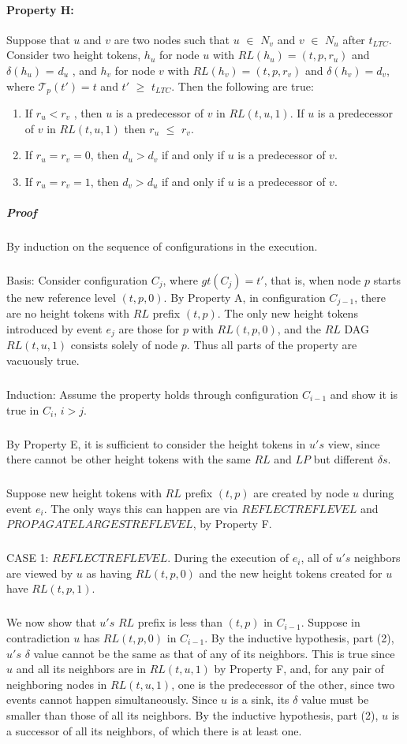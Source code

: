 \paragraph{Property H:} Suppose that $u$ and $v$ are two nodes such that $u$ $\in$ $N_v$ and $v$ $\in$ $N_u$ after $t_{LTC}$. Consider two height tokens, $h_u$ for node $u$ with $RL(h_u ) = (t, p, r_u )$ and $\delta (h_u )$ = $d_u$ , and $h_v$ for node $v$ with $RL(h_v ) = (t, p, r_v )$ and $\delta (h_v ) = d_v$, where $\mathcal{T}_p(t') = t$ and $t '$ $\geq$ $t_{LTC}$. Then the following are true: 
\begin{enumerate}
	\item If $r_u < r_v$ , then $u$ is a predecessor of $v$ in $RL (t, u, 1)$. If $u$ is a predecessor of $v$ in $RL (t, u, 1)$ then $r_u$ $\leq$ $r_v$.
	\item If $r_u = r_v = 0$, then $d_u > d_v$ if and only if $u$ is a predecessor of $v$.
	\item If $r_u = r_v = 1$, then $d_v > d_u$ if and only if $u$ is a predecessor of $v$.
\end{enumerate}
\subparagraph{Proof} By induction on the sequence of configurations in the execution. 
\subparagraph{}Basis: Consider configuration $C_j$, where $gt(C_j ) = t '$, that is, when node $p$ starts the new reference level $(t, p, 0)$. By Property A, in configuration $C_{j-1}$, there are no height tokens with $RL$ prefix $(t, p)$. The only new height tokens introduced by event $e_j$ are those for $p$ with $RL (t, p, 0)$, and the $RL$ DAG $RL (t, u, 1)$ consists solely of node $p$. Thus all parts of the property are vacuously true.
\subparagraph{}Induction: Assume the property holds through configuration $C_{i-1}$ and show it is true in $C_i$, $i > j$.
\subparagraph{}By Property E, it is sufficient to consider the height tokens in $u's$ view, since there cannot be other height tokens with the same $RL$ and $LP$ but different $\delta s$.
\subparagraph{}Suppose new height tokens with $RL$ prefix $(t, p)$ are created by node $u$ during event $e_i$. The only ways this can happen are via $REFLECTREFLEVEL$ and $PROPAGATELARGESTREFLEVEL$, by Property F.
\subparagraph{}CASE 1: $REFLECTREFLEVEL$. During the execution of $e_i$, all of $u's$ neighbors are viewed by $u$ as having $RL (t, p, 0)$ and the new height tokens created for $u$ have $RL (t, p, 1)$.
\subparagraph{}We now show that $u's$ $RL$ prefix is less than $(t, p)$ in $C_{i-1}$. Suppose in contradiction $u$ has $RL (t, p, 0)$ in $C_{i-1}$. By the inductive hypothesis, part (2), $u's$ $\delta$ value cannot be the same as that of any of its neighbors. This is true since $u$ and all its neighbors are in $RL (t, u, 1)$ by Property F, and, for any pair of neighboring nodes in $RL (t, u, 1)$, one is the predecessor of the other, since two events cannot happen simultaneously. Since $u$ is a sink, its $\delta$ value must be smaller than those of all its neighbors. By the inductive hypothesis, part (2), $u$ is a successor of all its neighbors, of which there is at least one.

